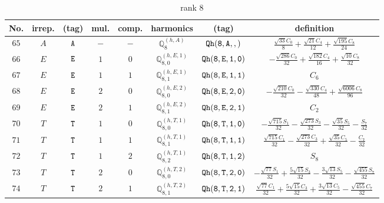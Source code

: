 \documentclass[fleqn,8pt]{jsarticle}
\begin{document}
\begin{table}[ht!]
\begin{center}
\caption{rank 8}
\renewcommand{\arraystretch}{1.3}
\begin{tabular}{cccccccc} \hline \hline
No. & irrep. & (tag) & mul. & comp. & harmonics & (tag) & definition \\ \hline
$ 65 $ & $ A $ & $ {\tt A} $ & $ - $ & $ - $ & $ \mathbb{Q}_{8}^{(h,A)} $ & $ {\tt Qh(8,A,,)} $ & $ \frac{\sqrt{33} C_{0}}{8} + \frac{\sqrt{21} C_{4}}{12} + \frac{\sqrt{195} C_{8}}{24} $ \\
$ 66 $ & $ E $ & $ {\tt E} $ & $ 1 $ & $ 0 $ & $ \mathbb{Q}_{8,0}^{(h,E,1)} $ & $ {\tt Qh(8,E,1,0)} $ & $ - \frac{\sqrt{286} C_{0}}{32} + \frac{\sqrt{182} C_{4}}{16} + \frac{\sqrt{10} C_{8}}{32} $ \\
$ 67 $ & $ E $ & $ {\tt E} $ & $ 1 $ & $ 1 $ & $ \mathbb{Q}_{8,1}^{(h,E,1)} $ & $ {\tt Qh(8,E,1,1)} $ & $ C_{6} $ \\
$ 68 $ & $ E $ & $ {\tt E} $ & $ 2 $ & $ 0 $ & $ \mathbb{Q}_{8,0}^{(h,E,2)} $ & $ {\tt Qh(8,E,2,0)} $ & $ - \frac{\sqrt{210} C_{0}}{32} - \frac{\sqrt{330} C_{4}}{48} + \frac{\sqrt{6006} C_{8}}{96} $ \\
$ 69 $ & $ E $ & $ {\tt E} $ & $ 2 $ & $ 1 $ & $ \mathbb{Q}_{8,1}^{(h,E,2)} $ & $ {\tt Qh(8,E,2,1)} $ & $ C_{2} $ \\
$ 70 $ & $ T $ & $ {\tt T} $ & $ 1 $ & $ 0 $ & $ \mathbb{Q}_{8,0}^{(h,T,1)} $ & $ {\tt Qh(8,T,1,0)} $ & $ - \frac{\sqrt{715} S_{1}}{32} - \frac{\sqrt{273} S_{3}}{32} - \frac{\sqrt{35} S_{5}}{32} - \frac{S_{7}}{32} $ \\
$ 71 $ & $ T $ & $ {\tt T} $ & $ 1 $ & $ 1 $ & $ \mathbb{Q}_{8,1}^{(h,T,1)} $ & $ {\tt Qh(8,T,1,1)} $ & $ \frac{\sqrt{715} C_{1}}{32} - \frac{\sqrt{273} C_{3}}{32} + \frac{\sqrt{35} C_{5}}{32} - \frac{C_{7}}{32} $ \\
$ 72 $ & $ T $ & $ {\tt T} $ & $ 1 $ & $ 2 $ & $ \mathbb{Q}_{8,2}^{(h,T,1)} $ & $ {\tt Qh(8,T,1,2)} $ & $ S_{8} $ \\
$ 73 $ & $ T $ & $ {\tt T} $ & $ 2 $ & $ 0 $ & $ \mathbb{Q}_{8,0}^{(h,T,2)} $ & $ {\tt Qh(8,T,2,0)} $ & $ - \frac{\sqrt{77} S_{1}}{32} + \frac{5 \sqrt{15} S_{3}}{32} - \frac{3 \sqrt{13} S_{5}}{32} - \frac{\sqrt{455} S_{7}}{32} $ \\
$ 74 $ & $ T $ & $ {\tt T} $ & $ 2 $ & $ 1 $ & $ \mathbb{Q}_{8,1}^{(h,T,2)} $ & $ {\tt Qh(8,T,2,1)} $ & $ \frac{\sqrt{77} C_{1}}{32} + \frac{5 \sqrt{15} C_{3}}{32} + \frac{3 \sqrt{13} C_{5}}{32} - \frac{\sqrt{455} C_{7}}{32} $ \\

\end{tabular}
\end{center}
\end{table}
\end{document}
